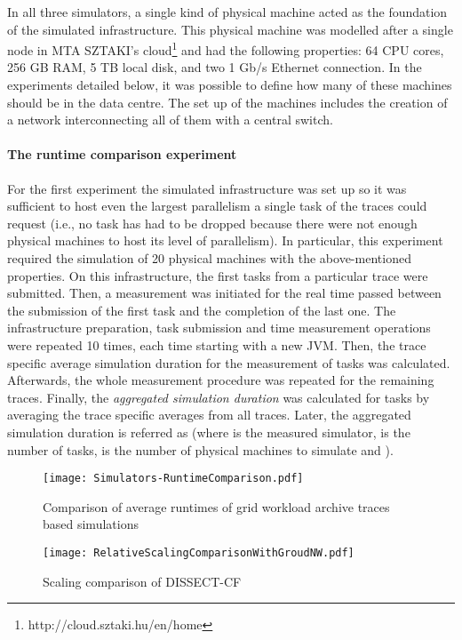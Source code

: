 \documentclass[sort, compress, 5p]{elsarticle}
\begin{document}
In all three simulators, a single kind of physical machine acted as the foundation of the simulated infrastructure. This physical machine was modelled after a single node in MTA SZTAKI's cloud\footnote{http://cloud.sztaki.hu/en/home} and had the following properties:  64 CPU cores,  256 GB RAM,  5 TB local disk, and  two 1 Gb/s Ethernet connection. In the experiments detailed below, it was possible to define how many of these machines should be in the data centre. The set up of the machines includes the creation of a network interconnecting all of them with a central switch.

\paragraph{The runtime comparison experiment}

For the first experiment the simulated infrastructure was set up so it was sufficient to host even the largest parallelism a single task of the traces could request (i.e., no task has had to be dropped because there were not enough physical machines to host its level of parallelism). In particular, this experiment required the simulation of 20 physical machines with the above-mentioned properties. On this infrastructure, the first  tasks from a particular trace were submitted. Then, a measurement was initiated for the real time passed between the submission of the first task and the completion of the last one. The infrastructure preparation, task submission and time measurement operations were repeated 10 times, each time starting with a new JVM. Then, the trace specific average simulation duration for the measurement of  tasks was calculated. Afterwards, the whole measurement procedure was repeated for the remaining traces. Finally, the \emph{aggregated simulation duration} was calculated for  tasks by averaging the trace specific averages from all traces. Later, the aggregated simulation duration is referred as  (where  is the measured simulator,  is the number of tasks,  is the number of physical machines to simulate and ).

\begin{figure}[tb]
\center
\texttt{[image: Simulators-RuntimeComparison.pdf]}
\caption{Comparison of average runtimes of grid workload archive traces based simulations\label{FIG-RuntimeCompare}}
\end{figure}
\begin{figure*}[tb]
\center
\texttt{[image: RelativeScalingComparisonWithGroudNW.pdf]}
\caption{Scaling comparison of DISSECT-CF \label{FIG-ScalingCompare}}
\end{figure*}
\end{document}
